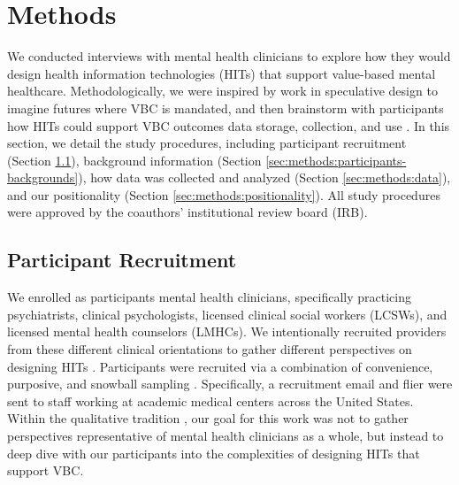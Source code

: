 \section{Methods}
\label{sec:methods}

We conducted interviews with mental health clinicians to explore how they would design health information technologies (HITs) that support value-based mental healthcare.
Methodologically, we were inspired by work in speculative design to imagine futures where VBC is mandated, and then brainstorm with participants how HITs could support VBC outcomes data storage, collection, and use \cite{hockenhull_speculative_2021, wong_speculative_2018}. 
In this section, we detail the study procedures, including participant recruitment (Section \ref{sec:methods:participants}), background information (Section \ref{sec:methods:participants-backgrounds}), how data was collected and analyzed (Section \ref{sec:methods:data}), and our positionality (Section \ref{sec:methods:positionality}). 
All study procedures were approved by the coauthors' institutional review board (IRB). 

\subsection{Participant Recruitment}
\label{sec:methods:participants}
We enrolled as participants mental health clinicians, specifically practicing psychiatrists, clinical psychologists, licensed clinical social workers (LCSWs), and licensed mental health counselors (LMHCs).
We intentionally recruited providers from these different clinical orientations to gather different perspectives on designing HITs \cite{mental_health_america_types_2024}. 
Participants were recruited via a combination of convenience, purposive, and snowball sampling \cite{etikan_comparison_2015, goodman_snowball_1961}.
Specifically, a recruitment email and flier were sent to staff working at academic medical centers across the United States. 
Within the qualitative tradition \cite{braun_one_2021}, our goal for this work was not to gather perspectives representative of mental health clinicians as a whole, but instead to deep dive with our participants into the complexities of designing HITs that support VBC.

